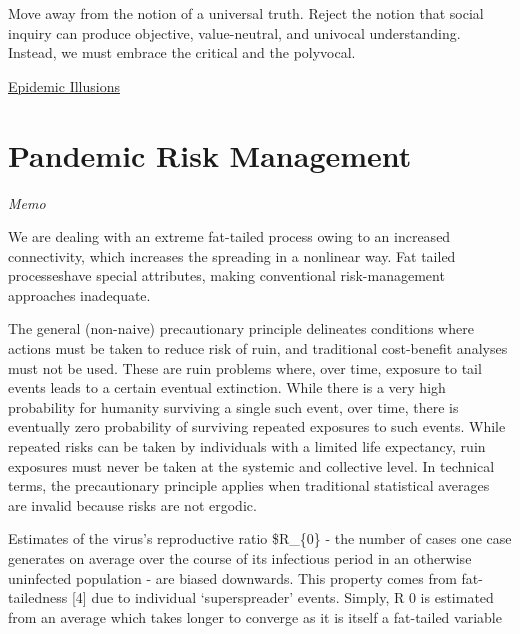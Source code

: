 \documentclass[
]{book}
\begin{document}
Move away from the notion of a universal truth.
Reject the notion that social inquiry can produce objective, value-neutral, and univocal understanding. Instead, we must embrace the critical and the polyvocal.

\href{https://naturemicrobiologycommunity.nature.com/posts/a-mind-bending-take-on-the-coloniality-of-global-public-health}{Epidemic Illusions}

\hypertarget{pandemic-risk-management}{%
\section{Pandemic Risk Management}\label{pandemic-risk-management}}

\emph{Memo}

We are dealing with an extreme fat-tailed process owing to an increased connectivity,
which increases the spreading in a nonlinear way.
Fat tailed processeshave special attributes, making conventional risk-management
approaches inadequate.

The general (non-naive) precautionary principle delineates conditions where actions
must be taken to reduce risk
of ruin, and traditional cost-benefit analyses must not be used.
These are ruin problems where, over time, exposure to tail
events leads to a certain eventual extinction. While there
is a very high probability for humanity surviving a single
such event, over time, there is eventually zero probability of
surviving repeated exposures to such events. While repeated
risks can be taken by individuals with a limited life expectancy,
ruin exposures must never be taken at the systemic and
collective level. In technical terms, the precautionary principle
applies when traditional statistical averages are invalid because
risks are not ergodic.

Estimates of the virus's reproductive
ratio \$R\_\{0\} - the number of cases one case generates on average
over the course of its infectious period in an otherwise
uninfected population - are biased downwards. This property
comes from fat-tailedness {[}4{]} due to individual `superspreader'
events. Simply, R 0 is estimated from an average which takes
longer to converge as it is itself a fat-tailed variable
\end{document}
